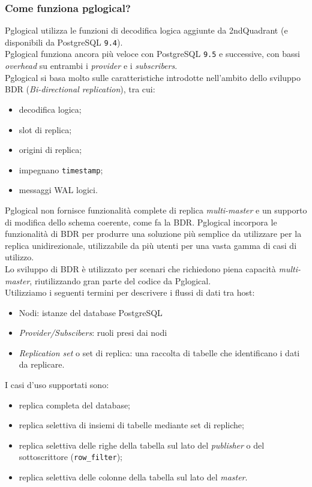 \subsubsection{Come funziona pglogical?}
Pglogical utilizza le funzioni di decodifica logica aggiunte da 2ndQuadrant (e disponibili da PostgreSQL \verb"9.4"). \\
Pglogical funziona ancora pi\`{u} veloce con PostgreSQL \verb"9.5" e successive, con bassi \textit{overhead} su entrambi i \textit{provider} e i \textit{subscribers}.\\
Pglogical si basa molto sulle caratteristiche introdotte nell'ambito dello sviluppo BDR (\textit{Bi-directional replication}), tra cui:

\begin{itemize}
\item
decodifica logica;
\item
slot di replica;
\item
origini di replica;
\item
impegnano \verb"timestamp";
\item
messaggi WAL logici\cite{etichetta3}.
\end{itemize}

Pglogical non fornisce funzionalit\`{a} complete di replica \textit{multi-master} e un supporto di modifica dello schema coerente, come fa la BDR. Pglogical incorpora le funzionalit\`{a} di BDR per produrre una soluzione pi\`{u} semplice da utilizzare per la replica unidirezionale, utilizzabile da pi\`{u} utenti per una vasta gamma di casi di utilizzo. \\
Lo sviluppo di BDR \`{e} utilizzato per scenari che richiedono piena capacit\`{a} \textit{multi-master}, riutilizzando gran parte del codice da Pglogical\cite{etichetta3}.\\

Utilizziamo i seguenti termini per descrivere i flussi di dati tra host:

\begin{itemize}
\item
Nodi: istanze del database PostgreSQL
\item 
\textit{Provider/Subscibers}: ruoli presi dai nodi
\item 
\textit{Replication set} o set di replica: una raccolta di tabelle che identificano i dati da replicare.
\end{itemize}

I casi d'uso supportati sono:
\begin{itemize}
\item 
replica completa del database;
\item 
replica selettiva di insiemi di tabelle mediante set di repliche;
\item 
replica selettiva delle righe della tabella sul lato del \textit{publisher} o del sottoscrittore (\verb"row_filter");
\item 
replica selettiva delle colonne della tabella sul lato del \textit{master}\cite{etichetta3}.
\end{itemize}

